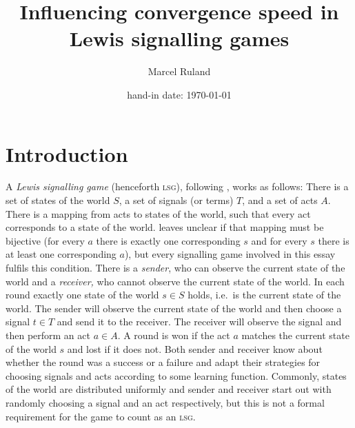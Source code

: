 \documentclass[DIV=calc,BCOR=0mm,pagesize]{scrartcl}
\title{Influencing convergence speed in Lewis signalling games}
\author{Marcel Ruland}
\date{hand-in date: \today}  %
\newcommand{\lsg}{\textsc{lsg}}
\begin{document}
\maketitle
\tableofcontents

\section{Introduction}
\label{sec:int}
A \emph{Lewis signalling game} (henceforth \lsg), following \citet[p.~530ff.]{barrett_dynamic_2007}, works as follows:
There is a set of states of the world \(S\), a set of signals (or terms) \(T\), and a set of acts \(A\).
There is a mapping from acts to states of the world, such that every act corresponds to a state of the world.
\citet{barrett_dynamic_2007} leaves unclear if that mapping must be bijective (for every \(a\) there is exactly one corresponding \(s\) and for every \(s\) there is at least one corresponding \(a\)), but every signalling game involved in this essay fulfils this condition.
There is a \emph{sender}, who can observe the current state of the world and a \emph{receiver,} who cannot observe the current state of the world.
In each round exactly one state of the world \(s \in S\) holds, i.e.~is the current state of the world.
The sender will observe the current state of the world and then choose a signal \(t \in T\) and send it to the receiver.
The receiver will observe the signal and then perform an act \(a \in A\).
A round is won if the act \(a\) matches the current state of the world \(s\) and lost if it does not.
Both sender and receiver know about whether the round was a success or a failure and adapt their strategies for choosing signals and acts according to some learning function.
Commonly, states of the world are distributed uniformly and sender and receiver start out with randomly choosing a signal and an act respectively, but this is not a formal requirement for the game to count as an \lsg.
\end{document}
